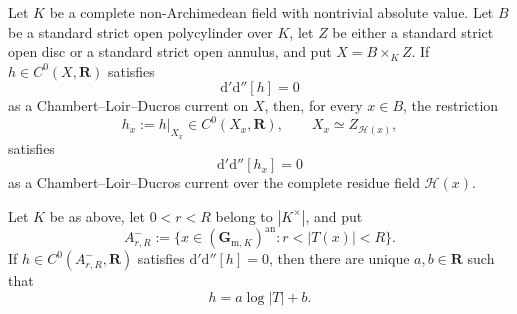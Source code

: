 
\begin{proposition}\label{prop:p062-product-fibre-zero-current-candidate}
Let \(K\) be a complete non-Archimedean field with nontrivial absolute
value. Let \(B\) be a standard strict open polycylinder over \(K\), let
\(Z\) be either a standard strict open disc or a standard strict open
annulus, and put \(X=B\times_K Z\). If
\(h\in C^0(X,\mathbf R)\) satisfies
\begin{equation}\label{eq:p062-product-zero-current-candidate}
                    \mathrm d'\mathrm d''[h]=0
\end{equation}
as a Chambert--Loir--Ducros current on \(X\), then, for every \(x\in B\),
the restriction
\[
       h_x:=h|_{X_x}\in C^0(X_x,\mathbf R),
       \qquad X_x\simeq Z_{\mathscr H(x)},
\]
satisfies
\begin{equation}\label{eq:p062-fibre-zero-current-candidate}
             \mathrm d'\mathrm d''[h_x]=0
\end{equation}
as a Chambert--Loir--Ducros current over the complete residue field
\(\mathscr H(x)\).
\end{proposition}

\begin{proposition}\label{prop:p062-arbitrary-field-annulus-candidate}
Let \(K\) be as above, let \(0<r<R\) belong to \(|K^\times|\), and put
\[
 A^-_{r,R}:=\{x\in(\mathbf G_{\mathrm m,K})^{\mathrm{an}}:
                         r<|T(x)|<R\}.
\]
If \(h\in C^0(A^-_{r,R},\mathbf R)\) satisfies
\(
 \mathrm d'\mathrm d''[h]=0
\), then there are unique \(a,b\in\mathbf R\) such that
\begin{equation}\label{eq:p062-annulus-affine-candidate}
                         h=a\log|T|+b.
\end{equation}
\end{proposition}

